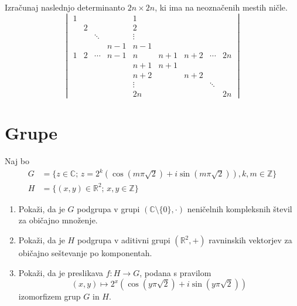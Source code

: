 \documentclass[a4paper,12pt]{article}
\begin{document}
Izračunaj naslednjo determinanto \(2n \times 2n\), ki ima na neoznačenih mestih ničle.
\[
\begin{vmatrix}
    1 & & & & 1 & & & & \\
    & 2 & & & 2 & & & & \\
    & & \ddots & & \vdots & & & & \\
    & & & n-1 & n-1 & & & & \\
    1 & 2 & \cdots & n-1 & n &  n+1 & n+2 &\cdots & 2n\\
    & & & & n+1 & n+1 & & & \\
    & & & & n+2 & & n+2 & & \\
    & & & & \vdots & & & \ddots & \\
    & & & & 2n & & & & 2n
\end{vmatrix}
\]
\section*{Grupe}

Naj bo
\begin{align*}
    G & =\{z\in\mathbb{C};\,z=2^k(\cos(m\pi\sqrt{2})+i\sin(m\pi\sqrt{2})),k,m\in \mathbb{Z}\}\\
    H & =\{(x,y)\in \mathbb{R}^2;\,x,y\in\mathbb{Z}\}
\end{align*}

\begin{enumerate}
\item
Pokaži, da je \(G\) podgrupa v grupi \((\mathbb{C}\setminus\{0\},\cdot)\)
neničelnih kompleksnih števil za običajno množenje.

\item
Pokaži, da je \(H\) podgrupa v aditivni grupi \((\mathbb{R}^2,+)\)
ravninskih vektorjev za običajno seštevanje po komponentah.

\item
Pokaži, da je preslikava \(f:H\to G\), podana s pravilom
\[(x,y)\mapsto2^x(\cos(y\pi\sqrt{2})+i\sin(y\pi\sqrt{2}))\]
izomorfizem grup \(G\) in \(H\).
\end{enumerate}
\end{document}
